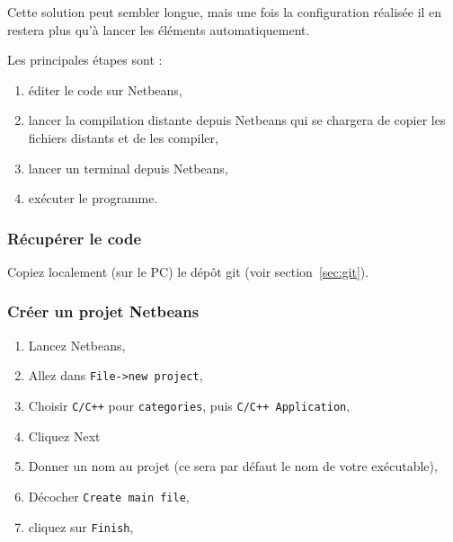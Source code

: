 \documentclass[11pt]{paper}
\begin{document}
Cette solution peut sembler longue, mais une fois la configuration réalisée il en restera plus qu'à lancer les éléments automatiquement.

Les principales étapes sont :
\begin{enumerate}
\item éditer le code sur Netbeans,
\item lancer la compilation distante depuis Netbeans qui se chargera de copier les fichiers distants et de les compiler,
\item lancer un terminal depuis Netbeans,
\item exécuter le programme.
\end{enumerate}

\subsubsection{Récupérer le code}

Copiez localement (sur le PC) le dépôt git (voir section~\ref{sec:git}).




\subsubsection{Créer un projet Netbeans}

\begin{enumerate}
\item Lancez Netbeans,
\item Allez dans {\tt File->new project},
\item Choisir {\tt C/C++} pour {\tt categories}, puis {\tt C/C++ Application},
\item Cliquez Next
\item Donner un nom au projet (ce sera par défaut le nom de votre exécutable),
\item Décocher {\tt Create main file},
\item cliquez sur  {\tt Finish},
\end{enumerate}
\end{document}

